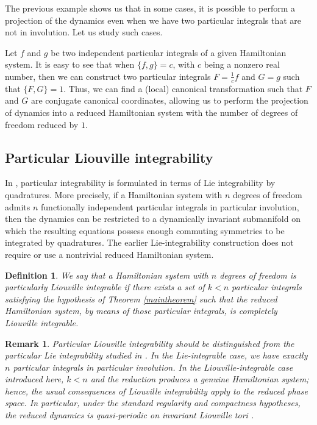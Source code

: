\documentclass[10pt,a4paper]{article}
\newtheorem{definition}{Definition}
\newtheorem{remark}{Remark}
\begin{document}
The previous example shows us that in some cases, it is possible to perform a projection of the dynamics even when we have two particular integrals that are not in involution. Let us study such cases. 

Let $f$ and $g$ be two independent particular integrals of a given Hamiltonian system. It is easy to see that when $\lbrace f,g\rbrace=c$, with $c$ being a nonzero real number, then we can construct two particular integrals $F=\frac{1}{c}f$ and $G=g$ such that $\lbrace F,G\rbrace=1$. Thus, we can find a (local) canonical transformation such that $F$ and $G$ are conjugate canonical coordinates, allowing us to perform the projection of dynamics into a reduced Hamiltonian system with the number of degrees of freedom reduced by $1$.



\subsection{Particular Liouville integrability}

In \cite{escobar2024particular}, particular integrability is formulated in terms of Lie integrability by quadratures. More precisely, if a Hamiltonian system with $n$ degrees of freedom admits $n$ functionally independent particular integrals in particular involution, then the dynamics can be restricted to a dynamically invariant submanifold on which the resulting equations possess enough commuting symmetries to be integrated by quadratures. The earlier Lie-integrability construction does not require or use a nontrivial reduced Hamiltonian system.

\begin{definition}
\label{def:particularLiouville}
We say that a Hamiltonian system with $n$ degrees of freedom is \emph{particularly Liouville integrable} if there exists a set of $k<n$ particular integrals satisfying the hypothesis of Theorem \ref{maintheorem} such that the reduced Hamiltonian system, by means of those particular integrals, is completely Liouville integrable.
\end{definition}

\begin{remark}
Particular Liouville integrability should be distinguished from the particular Lie integrability studied in \cite{escobar2024particular}. In the Lie-integrable case, we have exactly $n$ particular integrals in particular involution. In the Liouville-integrable case introduced here, $k<n$ and the reduction produces a genuine Hamiltonian system; hence, the usual consequences of Liouville integrability apply to the reduced phase space. In particular, under the standard regularity and compactness hypotheses, the reduced dynamics is quasi-periodic on invariant Liouville tori \cite{AKN2006}.
\end{remark}
\end{document}
